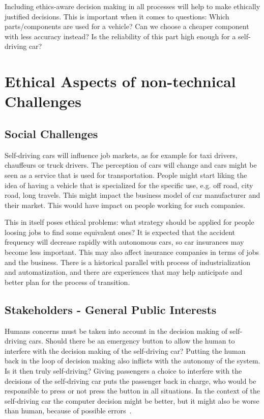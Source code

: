 Including ethics-aware decision making in all processes will help to make ethically justified decisions. This is important when it comes to questions: Which parts/components are used for a vehicle? Can we choose a cheaper component with less accuracy instead? Is the reliability of this part high enough for a self-driving car?



\section{Ethical Aspects of non-technical Challenges}
\label{sec:EAofNONTC}

\subsection{Social Challenges}
\label{sec:EAofNONTC:SocialChallenges}

Self-driving cars will influence job markets, as for example for taxi drivers, chauffeurs or truck drivers. The perception of cars will change and cars might be seen as a service that is used for transportation. People might start liking the idea of having a vehicle that is specialized for the specific use, e.g. off road, city road, long travels. This might impact the business model of car manufacturer and their market. This would have impact on people working for such companies.

This in itself poses ethical problems: what strategy should be applied for people loosing jobs to find some equivalent ones? It is expected that the accident frequency will decrease rapidly with autonomous cars, so car insurances may become less important. This may also affect insurance companies in terms of jobs and the business. There is a historical parallel with process of industrialization and automatization, and there are experiences that may help anticipate and better plan for the process of transition.


\subsection{Stakeholders - General Public Interests}
\label{sec:EAofNONTC:Stakeholders}

Humans concerns must be taken into account in the decision making of self-driving cars. %
Should there be an emergency button to allow the human to interfere with the decision making of the self-driving car? %
Putting the human back in the loop of decision making also inflicts with the autonomy of the system. Is it then truly self-driving? Giving passengers a choice to interfere with the decisions of the self-driving car puts the passenger back in charge, who would be responsible to press or not press the button in all situations. %
In the context of the self-driving car the computer decision might be better, but it might also be worse than human, because of possible errors~\cite{Eckstein2016}.

